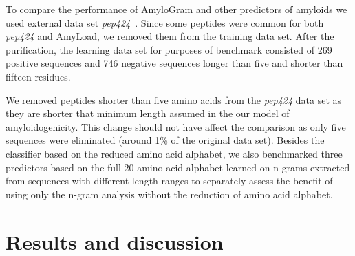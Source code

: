 \documentclass[a4,center,fleqn]{NAR}
\begin{document}
  To compare the performance of AmyloGram and other predictors of amyloids 
we used external data set \textit{pep424}~\citep{walsh_pasta_2014}. Since some 
peptides were common for both \textit{pep424} and AmyLoad, we removed them from 
the training data set. After the purification, the learning data set for purposes of 
benchmark consisted of 269 positive sequences and 746 negative sequences longer 
than five and shorter than fifteen residues.

  We removed peptides shorter than five amino acids from the \textit{pep424} data set 
as they are shorter that minimum length assumed in the our model of amyloidogenicity.
This change should not have affect the comparison as only five sequences were eliminated 
(around 1\% of the original data set). Besides the classifier based on the reduced amino acid alphabet, 
we also benchmarked three predictors based on the full 20-amino acid alphabet 
learned on n-grams extracted from sequences with different length ranges to separately 
assess the benefit of using only the n-gram analysis without the reduction of amino 
acid alphabet.


%
%
%
%
\section{Results and discussion}
\end{document}
